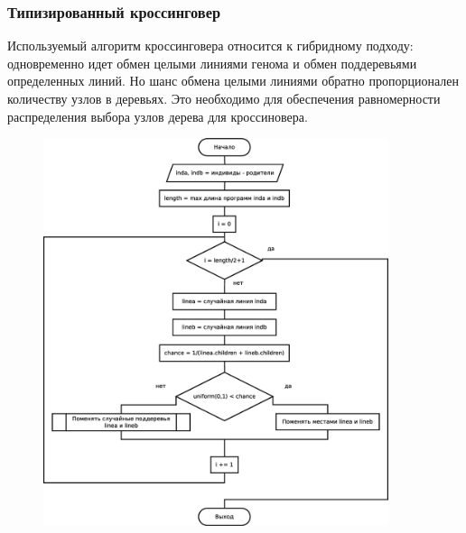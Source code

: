 \documentclass[russian,utf8,emptystyle]{eskdtext}
\begin{document}
\begin{spacing}{1.5}
\subsubsection{Типизированный кроссинговер}
Используемый алгоритм кроссинговера относится к гибридному подходу: одновременно идет обмен целыми линиями генома и обмен поддеревьями определенных линий. Но шанс обмена целыми линиями обратно пропорционален количеству узлов в деревьях. Это необходимо для обеспечения равномерности распределения выбора узлов дерева для кроссиновера.
\clearpage
\begin{figure}[h!]
\centering
\includegraphics[width=0.9\textwidth]{crossingover_alg.eps}
\end{figure}
\newpage


\end{spacing}
\end{document}
